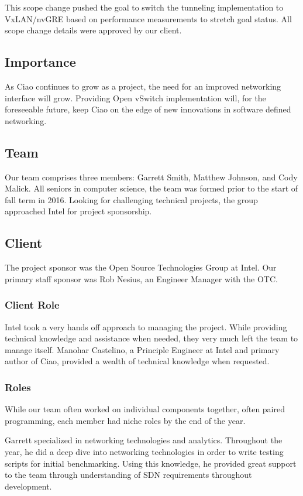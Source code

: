 \documentclass[10pt,onecolumn,journal,draftclsnofoot]{IEEEtran}
\begin{document}
This scope change pushed the goal to switch the tunneling implementation to
VxLAN/nvGRE based on performance measurements to stretch goal status. All scope
change details were approved by our client.


\subsection{Importance}
As Ciao continues to grow as a project, the need for an improved networking interface
will grow. Providing Open vSwitch implementation will, for the foreseeable future,
keep Ciao on the edge of new innovations in software defined networking.

\subsection{Team}
Our team comprises three members: Garrett Smith, Matthew Johnson, and Cody Malick. All
seniors in computer science, the team was formed prior to the start of fall term in 2016.
Looking for challenging technical projects, the group approached Intel for project
sponsorship.

\subsection{Client}
The project sponsor was the Open Source Technologies Group at Intel. Our primary staff
sponsor was Rob Nesius, an Engineer Manager with the OTC. 

\subsubsection{Client Role}
Intel took a very hands off approach to managing the project. While providing technical
knowledge and assistance when needed, they very much left the team to manage itself.
Manohar Castelino, a Principle Engineer at Intel and primary author of Ciao, provided a
wealth of technical knowledge when requested.

\subsubsection{Roles}
While our team often worked on individual components together, often paired programming,
each member had niche roles by the end of the year.

Garrett specialized in networking technologies and analytics. Throughout the year, he did
a deep dive into networking technologies in order to write testing scripts for initial
benchmarking. Using this knowledge, he provided great support to the team through
understanding of SDN requirements throughout development.
\end{document}
